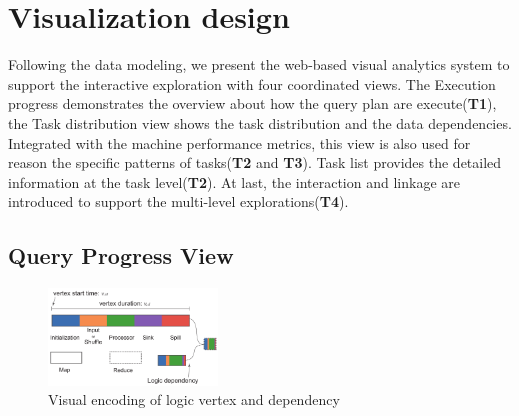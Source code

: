
\section{Visualization design}
Following the data modeling, we present the web-based visual analytics system to support the interactive exploration with four coordinated views. The Execution progress demonstrates the overview about how the query plan are execute(\textbf{T1}), the Task distribution view shows the task distribution and the data dependencies. Integrated with the machine performance metrics, this view is also used for reason the specific patterns of tasks(\textbf{T2} and \textbf{T3}).  Task list provides the detailed information at the task level(\textbf{T2}).  At last, the interaction and linkage are introduced to support the multi-level explorations(\textbf{T4}).

\subsection{Query Progress View}


\begin{figure}[t]
	\centering
	\includegraphics[width=0.40\textwidth]{figures/visualization/progressdesign.pdf}
	\vspace{-3mm}
	\caption{Visual encoding of logic vertex and dependency}
	\label{fig:progress}
	\vspace{-3mm}
\end{figure}



